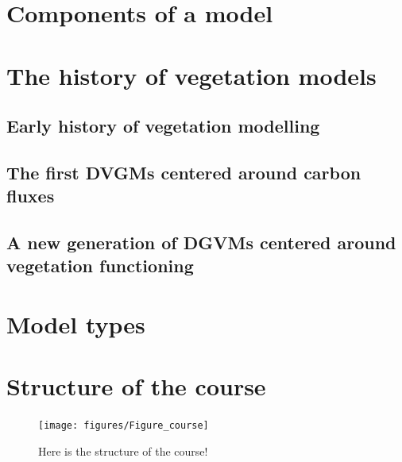 \documentclass[
  oneside]{book}
\begin{document}
\hypertarget{components-of-a-model}{%
\section{Components of a model}\label{components-of-a-model}}

\hypertarget{the-history-of-vegetation-models}{%
\section{The history of vegetation models}\label{the-history-of-vegetation-models}}

\hypertarget{early-history-of-vegetation-modelling}{%
\subsection{Early history of vegetation modelling}\label{early-history-of-vegetation-modelling}}

\hypertarget{the-first-dvgms-centered-around-carbon-fluxes}{%
\subsection{The first DVGMs centered around carbon fluxes}\label{the-first-dvgms-centered-around-carbon-fluxes}}

\hypertarget{a-new-generation-of-dgvms-centered-around-vegetation-functioning}{%
\subsection{A new generation of DGVMs centered around vegetation functioning}\label{a-new-generation-of-dgvms-centered-around-vegetation-functioning}}

\hypertarget{model-types}{%
\section{Model types}\label{model-types}}

\hypertarget{structure-of-the-course}{%
\section{Structure of the course}\label{structure-of-the-course}}

\begin{figure}

{\centering \texttt{[image: figures/Figure\_course]} 

}

\caption{Here is the structure of the course!}\label{fig:nice-fig2}
\end{figure}
\end{document}
